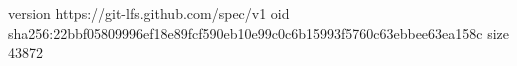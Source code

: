 version https://git-lfs.github.com/spec/v1
oid sha256:22bbf05809996ef18e89fcf590eb10e99c0c6b15993f5760c63ebbee63ea158c
size 43872
